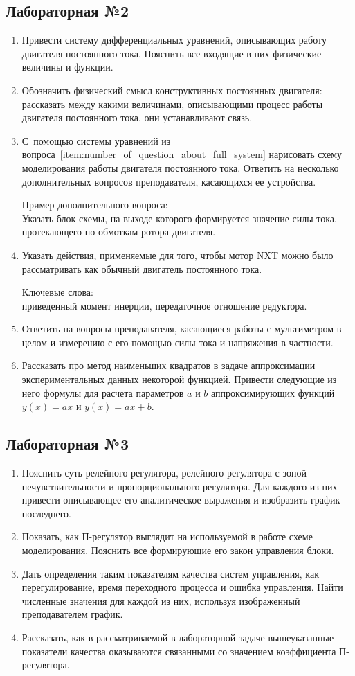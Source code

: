 \documentclass[12pt,a4paper]{article}
\begin{document}
\subsection*{Лабораторная №2}
\begin{enumerate}
\item Привести систему дифференциальных уравнений, описывающих работу двигателя постоянного тока. Пояснить все входящие в них физические величины и функции.\label{item:number_of_question_about_full_system}
\item Обозначить физический смысл конструктивных постоянных двигателя: рассказать между какими величинами, описывающими процесс работы двигателя постоянного тока, они устанавливают связь.
\item С~помощью системы уравнений из вопроса~\ref{item:number_of_question_about_full_system} нарисовать схему моделирования работы двигателя постоянного тока. Ответить на несколько дополнительных вопросов преподавателя, касающихся ее устройства.

Пример дополнительного вопроса:\\
Указать блок схемы, на выходе которого формируется значение силы тока, протекающего по обмоткам ротора двигателя.
\item Указать действия, применяемые для того, чтобы мотор NXT можно было рассматривать как обычный двигатель постоянного тока. 

Ключевые слова:\\
приведенный момент инерции, передаточное отношение редуктора.
\item Ответить на вопросы преподавателя, касающиеся работы с мультиметром в целом и измерению с его помощью силы тока и напряжения в частности.
\item Рассказать про метод наименьших квадратов в задаче аппроксимации экспериментальных данных некоторой функцией. Привести следующие из него формулы для расчета параметров $a$ и $b$ аппроксимирующих функций $y(x) = ax$ и $y(x) = ax + b$.
\end{enumerate}

\subsection*{Лабораторная №3}
\begin{enumerate}
\item Пояснить суть релейного регулятора, релейного регулятора с зоной нечувствительности и пропорционального регулятора. Для каждого из них привести описывающее его аналитическое выражения и изобразить график последнего.
\item Показать, как П-регулятор выглядит на используемой в работе схеме моделирования. Пояснить все формирующие его закон управления блоки.
\item Дать определения таким показателям качества систем управления, как перегулирование, время переходного процесса и ошибка управления. Найти численные значения для каждой из них, используя изображенный преподавателем график.
\item Рассказать, как в рассматриваемой в лабораторной задаче вышеуказанные показатели качества оказываются связанными со значением коэффициента П-регулятора. 
\end{enumerate}
\end{document}
